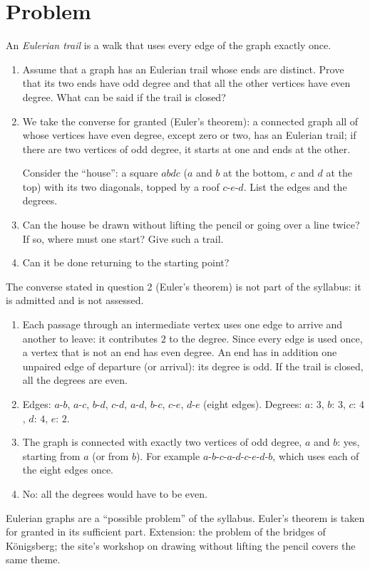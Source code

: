 \mxnewpage
\section{Problem}
\begin{problem}
An \emph{Eulerian trail} is a walk that uses every edge of the graph exactly once.
\begin{enumerate}
\item Assume that a graph has an Eulerian trail whose ends are distinct. Prove that its two ends have odd degree and that all the other vertices have even degree. What can be said if the trail is closed?
\item We take the converse for granted (Euler's theorem): a connected graph all of whose vertices have even degree, except zero or two, has an Eulerian trail; if there are two vertices of odd degree, it starts at one and ends at the other.\par
Consider the ``house'': a square $abdc$ ($a$ and $b$ at the bottom, $c$ and $d$ at the top) with its two diagonals, topped by a roof $c$-$e$-$d$. List the edges and the degrees.
\item Can the house be drawn without lifting the pencil or going over a line twice? If so, where must one start? Give such a trail.
\item Can it be done returning to the starting point?
\end{enumerate}
\end{problem}
\begin{beyond}The converse stated in question 2 (Euler's theorem) is not part of the syllabus: it is admitted and is not assessed.\end{beyond}
\begin{solution}[Problem]
\begin{enumerate}
\item Each passage through an intermediate vertex uses one edge to arrive and another to leave: it contributes $2$ to the degree. Since every edge is used once, a vertex that is not an end has even degree. An end has in addition one unpaired edge of departure (or arrival): its degree is odd. If the trail is closed, all the degrees are even.
\item Edges: $a$-$b$, $a$-$c$, $b$-$d$, $c$-$d$, $a$-$d$, $b$-$c$, $c$-$e$, $d$-$e$ (eight edges). Degrees: $a$: $3$, $b$: $3$, $c$: $4$, $d$: $4$, $e$: $2$.
\item The graph is connected with exactly two vertices of odd degree, $a$ and $b$: yes, starting from $a$ (or from $b$). For example $a$-$b$-$c$-$a$-$d$-$c$-$e$-$d$-$b$, which uses each of the eight edges once.
\item No: all the degrees would have to be even.
\end{enumerate}
\end{solution}
\begin{teachernote}
Eulerian graphs are a ``possible problem'' of the syllabus. Euler's theorem is taken for granted in its sufficient part. Extension: the problem of the bridges of Königsberg; the site's workshop on drawing without lifting the pencil covers the same theme.
\end{teachernote}
